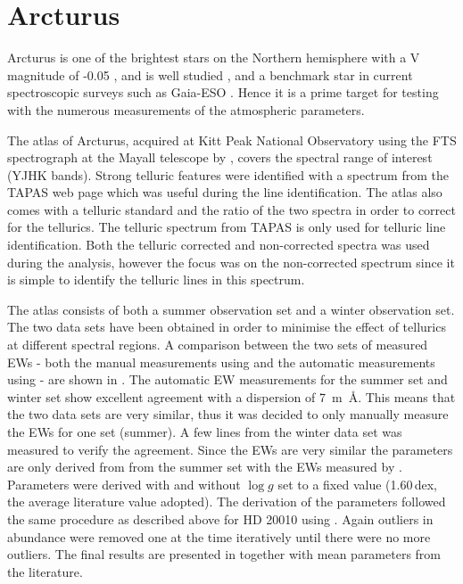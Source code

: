 \section{Arcturus}
\label{sec:arcturus}

Arcturus is one of the brightest stars on the Northern hemisphere with a V magnitude of -0.05
\citep{Ducati2002}, and is well studied \citep[see e.g.][to mention just a
few]{Griffin1967,McWilliam1990,Ramirez2013}, and a benchmark star in current spectroscopic surveys
such as Gaia-ESO \citep{Jofre2014,Smiljanic2014}. Hence it is a prime target for testing with the
numerous measurements of the atmospheric parameters.

The atlas of Arcturus, acquired at Kitt Peak National Observatory using the FTS spectrograph at the
Mayall telescope by \citet{Hinkle1995a}, covers the spectral range of interest (YJHK bands). Strong
telluric features were identified with a spectrum from the TAPAS web page \citep{Bertaux2014} which
was useful during the line identification. The atlas also comes with a telluric standard and the
ratio of the two spectra in order to correct for the tellurics. The telluric spectrum from TAPAS is
only used for telluric line identification. Both the telluric corrected and non-corrected spectra
was used during the analysis, however the focus was on the non-corrected spectrum since it is simple
to identify the telluric lines in this spectrum.

The atlas consists of both a summer observation set and a winter observation set. The two data sets
have been obtained in order to minimise the effect of tellurics at different spectral regions. A
comparison between the two sets of measured EWs - both the manual measurements using  and
the automatic measurements using \ARES - are shown in . The automatic EW
measurements for the summer set and winter set show excellent agreement with a dispersion of
\SI{7}{m\angstrom}. This means that the two data sets are very similar, thus it was decided to only
manually measure the EWs for one set (summer). A few lines from the winter data set was measured to
verify the agreement. Since the EWs are very similar the parameters are only derived from from the
summer set with the EWs measured by \ARES. Parameters were derived with and without $\log g$ set to
a fixed value (1.60\,dex, the average literature value adopted). The derivation of the parameters
followed the same procedure as described above for HD 20010 using \FASMA. Again outliers in
abundance were removed one at the time iteratively until there were no more outliers. The final
results are presented in  together with mean parameters from the literature.

